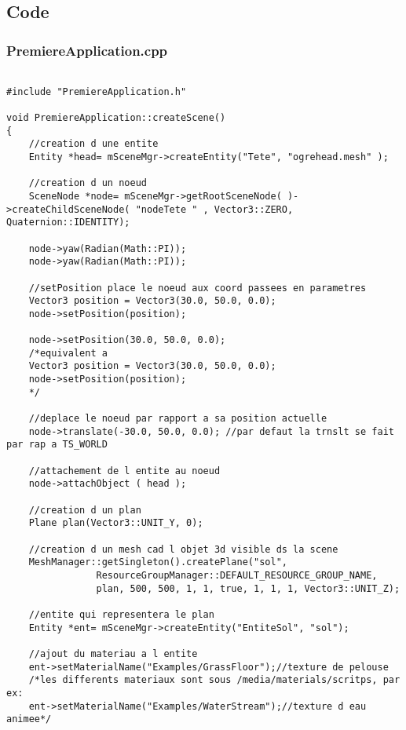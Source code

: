 \documentclass[10pt,a4paper]{report}
\begin{document}
\subsection{Code}

\subsubsection{PremiereApplication.cpp}
\begin{lstlisting}[caption={PremiereApplication.cpp: Cr\'eation de la cam\'era}]

#include "PremiereApplication.h"

void PremiereApplication::createScene()
{
    //creation d une entite
    Entity *head= mSceneMgr->createEntity("Tete", "ogrehead.mesh" );
    
    //creation d un noeud
    SceneNode *node= mSceneMgr->getRootSceneNode( )->createChildSceneNode( "nodeTete " , Vector3::ZERO, Quaternion::IDENTITY);
    
    node->yaw(Radian(Math::PI));
    node->yaw(Radian(Math::PI));

    //setPosition place le noeud aux coord passees en parametres
    Vector3 position = Vector3(30.0, 50.0, 0.0);
    node->setPosition(position);

    node->setPosition(30.0, 50.0, 0.0); 
    /*equivalent a
    Vector3 position = Vector3(30.0, 50.0, 0.0);
    node->setPosition(position);
    */

    //deplace le noeud par rapport a sa position actuelle
    node->translate(-30.0, 50.0, 0.0); //par defaut la trnslt se fait par rap a TS_WORLD
   
    //attachement de l entite au noeud
    node->attachObject ( head );

    //creation d un plan
    Plane plan(Vector3::UNIT_Y, 0);

    //creation d un mesh cad l objet 3d visible ds la scene
    MeshManager::getSingleton().createPlane("sol",
                ResourceGroupManager::DEFAULT_RESOURCE_GROUP_NAME,
                plan, 500, 500, 1, 1, true, 1, 1, 1, Vector3::UNIT_Z); 

    //entite qui representera le plan
    Entity *ent= mSceneMgr->createEntity("EntiteSol", "sol");

    //ajout du materiau a l entite
    ent->setMaterialName("Examples/GrassFloor");//texture de pelouse
    /*les differents materiaux sont sous /media/materials/scritps, par ex:
    ent->setMaterialName("Examples/WaterStream");//texture d eau animee*/


\end{lstlisting}
\end{document}
